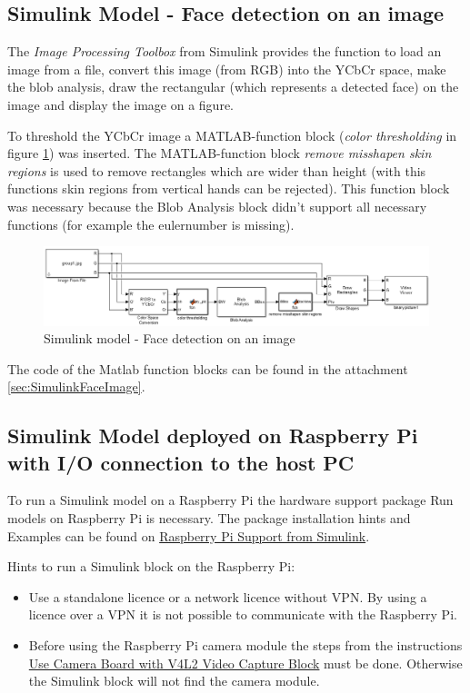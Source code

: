 \documentclass[SensorSystemsProject.tex]{subfiles}
\begin{document}
\subsection{Simulink Model - Face detection on an image}
The \textit{Image Processing Toolbox } from Simulink provides the function to load an image from a file, convert this image (from RGB) into the YCbCr space, make the blob analysis, draw the rectangular (which represents a detected face) on the image and display the image on a figure. 

To threshold the YCbCr image a MATLAB-function block (\textit{color thresholding} in figure \ref{SimulinkImage}) was inserted. The MATLAB-function block \textit{remove misshapen skin regions} is used to remove rectangles which are wider than height (with this functions skin regions from vertical hands can be rejected). This function block was necessary because the Blob Analysis block didn't support all necessary functions (for example the eulernumber is missing).

\begin{figure}[!h]
\centering
\includegraphics[width=14cm]{./img/simulink/Simulink_ImageProcessing.PNG} 
\caption{Simulink model - Face detection on an image}
\label{SimulinkImage}
\end{figure}

The code of the Matlab function blocks can be found in the attachment \ref{sec:SimulinkFaceImage}.


\subsection{Simulink Model deployed on Raspberry Pi with I/O connection to the host PC}

To run a Simulink model on a Raspberry Pi the hardware support package Run models on Raspberry Pi is necessary. The package installation hints and Examples can be found on \href{https://de.mathworks.com/hardware-support/raspberry-pi-simulink.html}{Raspberry Pi Support from Simulink}. 

\medskip
Hints to run a Simulink block on the Raspberry Pi:
\begin{itemize}
\item Use a standalone licence or a network licence without VPN. By using a licence over a VPN it is not possible to communicate with the Raspberry Pi.
\item Before using the Raspberry Pi camera module the steps from the instructions \href{https://de.mathworks.com/help/supportpkg/raspberrypi/ug/add-support-for-raspberry-pi-camera-board.html}{Use Camera Board with V4L2 Video Capture Block} must be done. Otherwise the Simulink block will not find the camera module.
\end{itemize}
\end{document}
